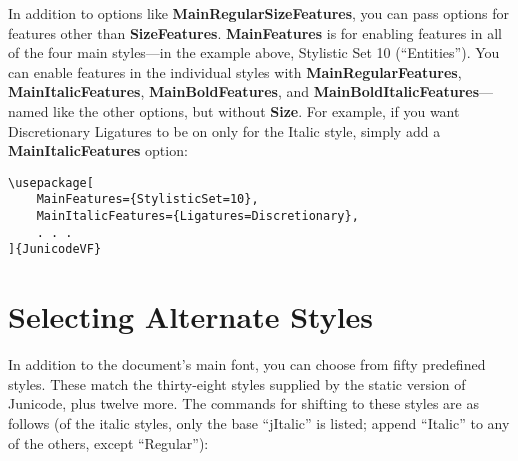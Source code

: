 \documentclass[12pt]{article}
\begin{document}
\noindent In addition to options like \textbf{MainRegularSizeFeatures},
you can pass options for features other than \textbf{SizeFeatures}.
\textbf{MainFeatures} is for enabling features in all of the four
main styles---in the example above, Stylistic Set 10 (“Entities”).
You can enable features in the individual styles with
\textbf{MainRegularFeatures}, \textbf{MainItalicFeatures},
\textbf{MainBoldFeatures}, and \textbf{MainBoldItalicFeatures}---named 
like the other options, but without \textbf{Size}.
For example, if you want Discretionary Ligatures to be on only for the
Italic style, simply add a \textbf{MainItalicFeatures} option:

\footnotesize
\begin{verbatim}
\usepackage[
    MainFeatures={StylisticSet=10},
    MainItalicFeatures={Ligatures=Discretionary},
    . . .
]{JunicodeVF}
\end{verbatim}
\normalsize

\section{Selecting Alternate Styles}

In addition to the document's main font, you can choose from fifty
predefined styles. These match the thirty-eight styles supplied by the
static version of Junicode, plus twelve more. The commands for shifting to these
styles are as follows (of the italic styles, only the base “jItalic” is listed;
append “Italic” to any of the others, except “Regular”):
\end{document}
